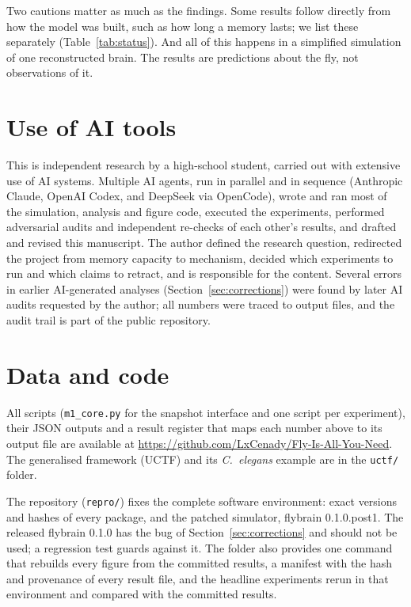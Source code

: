 \documentclass[conference]{IEEEtran}
\begin{document}
Two cautions matter as much as the findings. Some results follow directly from
how the model was built, such as how long a memory lasts; we list these
separately (Table~\ref{tab:status}). And all of this happens in a simplified
simulation of one reconstructed brain. The results are predictions about the
fly, not observations of it.

\section*{Use of AI tools}
This is independent research by a high-school student, carried out with
extensive use of AI systems. Multiple AI agents, run in parallel and in
sequence (Anthropic Claude, OpenAI Codex, and DeepSeek via OpenCode), wrote and
ran most of the simulation, analysis and figure code, executed the
experiments, performed adversarial audits and independent re-checks of each
other's results, and drafted and revised this manuscript. The author defined
the research question, redirected the project from memory capacity to
mechanism, decided which experiments to run and which claims to retract, and
is responsible for the content. Several errors in earlier AI-generated analyses
(Section~\ref{sec:corrections}) were found by later AI audits requested by the
author; all numbers were traced to output files, and the audit trail is part of
the public repository.

\section*{Data and code}
All scripts (\texttt{m1\_core.py} for the snapshot interface and one script
per experiment), their JSON outputs and a result register that maps each number
above to its output file are available at
\url{https://github.com/LxCenady/Fly-Is-All-You-Need}. The generalised framework
(UCTF) and its \textit{C.~elegans} example are in the \texttt{uctf/} folder.

The repository (\texttt{repro/}) fixes the complete software environment:
exact versions and hashes of every package, and the patched simulator,
flybrain 0.1.0.post1. The released flybrain 0.1.0 has the bug of
Section~\ref{sec:corrections} and should not be used; a regression test
guards against it. The folder also provides one command that rebuilds every
figure from the committed results, a manifest with the hash and provenance of
every result file, and the headline experiments rerun in that environment
and compared with the committed results.
\end{document}
